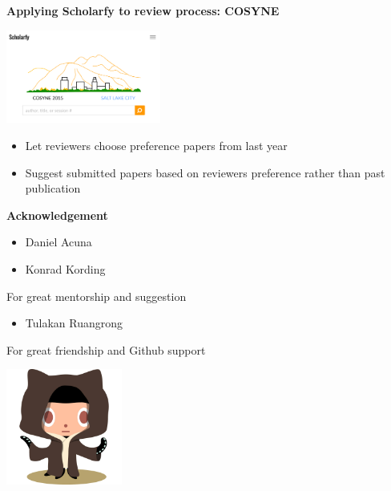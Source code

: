 \begin{frame}{\textbf{Applying Scholarfy to review process: COSYNE}}

\begin{center}
\href{http://cosyne.scienceofscience.org/}{\includegraphics[width=2.0in]{images/cosyne}}
\end{center}

\begin{itemize}
\item Let reviewers choose preference papers from last year
\item Suggest submitted papers based on reviewers preference rather than past publication
\end{itemize}

\end{frame}



\begin{frame}{\textbf{Acknowledgement}}

\begin{itemize}
\item Daniel Acuna
\item Konrad Kording
\end{itemize}

For great mentorship and suggestion

\begin{itemize}
\item Tulakan Ruangrong
\end{itemize}

For great friendship and Github support

\begin{center}
\includegraphics[width=1.5in]{images/octobiwan}
\end{center}

\end{frame}


